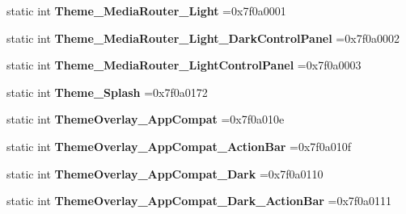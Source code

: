 \begin{DoxyCompactItemize}
\item 
\mbox{\label{classandroid_1_1support_1_1design_1_1R_1_1style_aa3716c57e6885615d5cd820de15f2694}} 
static int {\bfseries Theme\+\_\+\+Media\+Router\+\_\+\+Light} =0x7f0a0001
\item 
\mbox{\label{classandroid_1_1support_1_1design_1_1R_1_1style_a335d362d4e48e4631441904c718a8597}} 
static int {\bfseries Theme\+\_\+\+Media\+Router\+\_\+\+Light\+\_\+\+Dark\+Control\+Panel} =0x7f0a0002
\item 
\mbox{\label{classandroid_1_1support_1_1design_1_1R_1_1style_af8dbc570d18833f80396dd47b52cb48c}} 
static int {\bfseries Theme\+\_\+\+Media\+Router\+\_\+\+Light\+Control\+Panel} =0x7f0a0003
\item 
\mbox{\label{classandroid_1_1support_1_1design_1_1R_1_1style_a76cc3d408126763aa17d83693c94400b}} 
static int {\bfseries Theme\+\_\+\+Splash} =0x7f0a0172
\item 
\mbox{\label{classandroid_1_1support_1_1design_1_1R_1_1style_abf1afdbc26fd0c07bb91cbbdc2a5ef5d}} 
static int {\bfseries Theme\+Overlay\+\_\+\+App\+Compat} =0x7f0a010e
\item 
\mbox{\label{classandroid_1_1support_1_1design_1_1R_1_1style_a554cad799baf76f1e44a5b1d667488d5}} 
static int {\bfseries Theme\+Overlay\+\_\+\+App\+Compat\+\_\+\+Action\+Bar} =0x7f0a010f
\item 
\mbox{\label{classandroid_1_1support_1_1design_1_1R_1_1style_a546ed4dddaa1fe0b7cd8a5c4b2bea491}} 
static int {\bfseries Theme\+Overlay\+\_\+\+App\+Compat\+\_\+\+Dark} =0x7f0a0110
\item 
\mbox{\label{classandroid_1_1support_1_1design_1_1R_1_1style_a0eb5bc1ed1fd811e8fa5235beb203777}} 
static int {\bfseries Theme\+Overlay\+\_\+\+App\+Compat\+\_\+\+Dark\+\_\+\+Action\+Bar} =0x7f0a0111
\item 

\end{DoxyCompactItemize}
